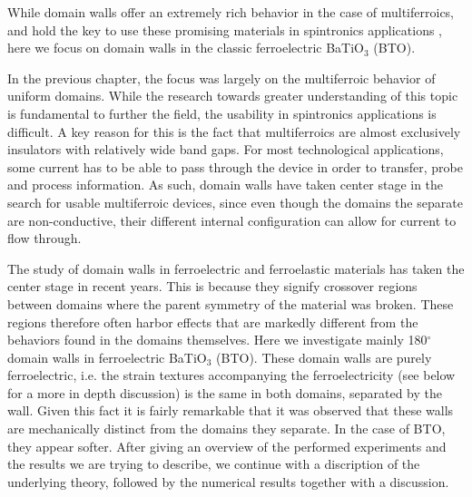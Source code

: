 While domain walls offer an extremely rich behavior in the case of multiferroics, and hold the key to use these promising materials in spintronics applications \cite{Lee2014}, here we focus on domain walls in the classic ferroelectric BaTiO$_3$ (BTO).   



In the previous chapter, the focus was largely on the multiferroic behavior of uniform domains. While the research towards greater understanding of this topic is fundamental to further the field, the usability in spintronics applications is difficult.
A key reason for this is the fact that multiferroics are almost exclusively insulators with relatively wide band gaps.
For most technological applications, some current has to be able to pass through the device in order to transfer, probe and process information.
As such, domain walls have taken center stage in the search for usable multiferroic devices, since even though the domains the separate are non-conductive, their different internal configuration can allow for current to flow through.


The study of domain walls in ferroelectric and ferroelastic materials has taken the center stage in recent years. This is because they signify crossover regions between domains where the parent symmetry of the material was broken. These regions therefore often harbor effects that are markedly different from the behaviors found in the domains themselves. Here we investigate mainly 180$^\circ$ domain walls in ferroelectric BaTiO$_3$ (BTO).
These domain walls are purely ferroelectric, i.e. the strain textures accompanying the ferroelectricity (see below for a more in depth discussion) is the same in both domains, separated by the wall. Given this fact it is fairly remarkable that it was observed that these walls are mechanically distinct from the domains they separate. In the case of BTO, they appear softer.
After giving an overview of the performed experiments and the results we are trying to describe, we continue with a discription of the underlying theory, followed by the numerical results together with a discussion.


